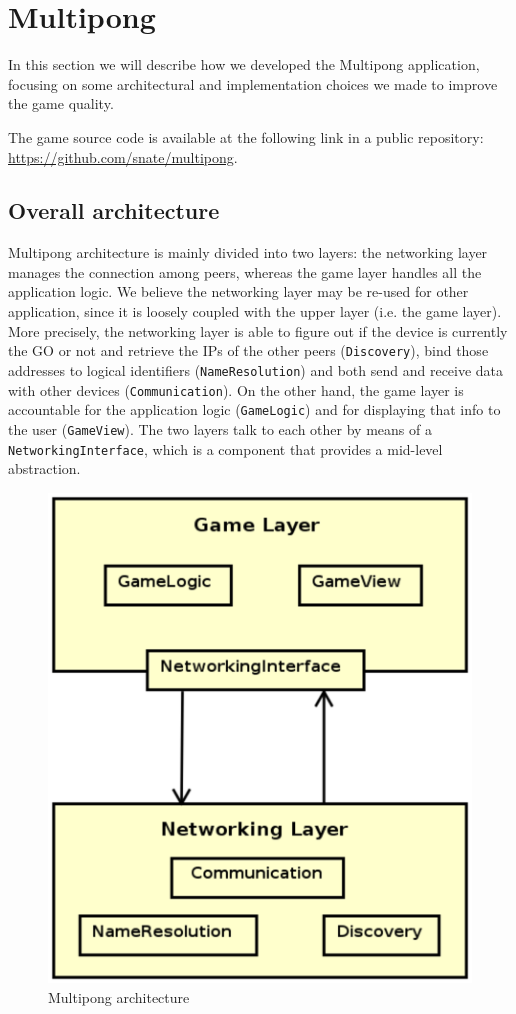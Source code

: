 \section{Multipong} %

In this section we will describe how we developed the Multipong application,
focusing on some architectural and implementation choices we made to improve
the game quality.

The game source code is available at the following link in a public
repository: \url{https://github.com/snate/multipong}.

\subsection{Overall architecture}

Multipong architecture is mainly divided into two layers: the networking layer
manages the connection among peers, whereas the game layer handles all the
application logic. We believe the networking layer may be re-used for other
application, since it is loosely coupled with the upper layer (i.e. the game
layer).
More precisely, the networking layer is able to figure out if the device is
currently the GO or not and retrieve the IPs of the other peers
(\texttt{Discovery}), bind those addresses to logical identifiers
(\texttt{NameResolution}) and both send and receive data with other devices
(\texttt{Communication}).
On the other hand, the game layer is accountable for the application logic
(\texttt{GameLogic}) and for displaying that info to the user
(\texttt{GameView}).
The two layers talk to each other by means of a \texttt{NetworkingInterface},
which is a component that provides a mid-level abstraction.

\begin{figure}[H]
  \centering\includegraphics[width=.7\columnwidth]{img/layered-architecture.eps}

  \caption{Multipong architecture}\label{fig:layered-arch}
\end{figure}

